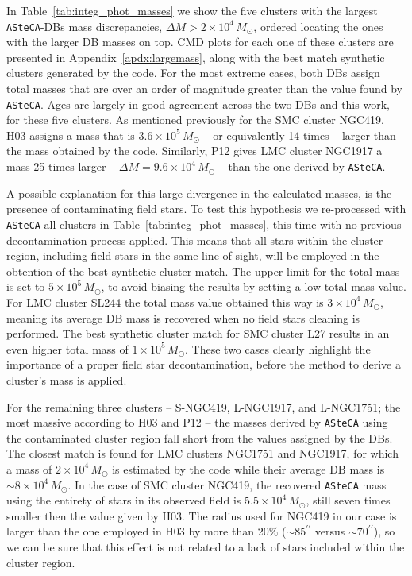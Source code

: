 \documentclass{aa}
\begin{document}
%
In Table~\ref{tab:integ_phot_masses} we show the five clusters with the largest
\texttt{ASteCA}-DBs mass discrepancies, $\Delta M{>}2{\times}10^4\,M_{\odot}$,
ordered locating the ones with the larger DB masses on top.
CMD plots for each one of these clusters are presented in
Appendix~\ref{apdx:largemass}, along with the best match synthetic clusters
generated by the code.
For the most extreme cases, both DBs assign total masses that are over an order
of magnitude greater than the value found by \texttt{ASteCA}.
Ages are largely in good agreement across the two DBs and this work, for these
five clusters.
As mentioned previously for the SMC cluster NGC419, H03 assigns a mass that is
$3.6{\times}10^5\,M_{\odot}$ -- or equivalently 14 times -- larger than the mass
obtained by the code. Similarly, P12 gives LMC cluster NGC1917 a mass 25
times larger -- $\Delta M{=}9.6{\times}10^4\,M_{\odot}$ -- than the one
derived by \texttt{ASteCA}.

A possible explanation for this large divergence in the calculated masses, is
the presence of contaminating field stars.
To test this hypothesis we re-processed with \texttt{ASteCA} all clusters in
Table~\ref{tab:integ_phot_masses}, this time with no previous decontamination
process applied. This means that all stars within the cluster region, including
field stars in the same line of sight, will be employed in the obtention of 
the best synthetic cluster match. The upper limit for the total mass is set to
$5{\times}10^5\,M_{\odot}$, to avoid biasing the results by setting a low total
mass value.
%
For LMC cluster SL244 the total mass value obtained this way is
$3{\times}10^4\,M_{\odot}$, meaning its average DB mass is recovered when no
field stars cleaning is performed.
The best synthetic cluster match for SMC cluster L27 results in an even higher
total mass of $1{\times}10^5\,M_{\odot}$. These two cases clearly highlight the
importance of a proper field star decontamination, before the method to derive a
cluster's mass is applied.

For the remaining three clusters -- S-NGC419, L-NGC1917, and L-NGC1751; the most
massive according to H03 and P12 -- the masses derived by \texttt{ASteCA} using
the contaminated cluster region fall short from the values assigned by the DBs.
The closest match is found for LMC clusters NGC1751 and NGC1917, for which a
mass of $2{\times}10^4\,M_{\odot}$ is estimated by the code while their average DB
mass is ${\sim}8{\times}10^4\,M_{\odot}$.
In the case of SMC cluster NGC419, the recovered \texttt{ASteCA} mass using the
entirety of stars in its observed field is $5.5{\times}10^4\,M_{\odot}$, still
seven times smaller then the value given by H03. The radius used for NGC419 in
our case is larger than the one employed in H03 by more than 20\%
(${\sim}85^{\prime\prime}$ versus ${\sim}70^{\prime\prime}$), so we can be sure
that this effect is not related to a lack of stars included within the cluster
region.
\end{document}
